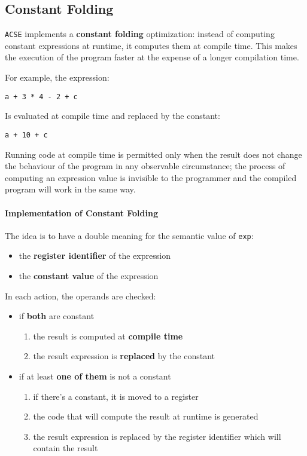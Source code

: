 \subsection{Constant Folding}

\texttt{ACSE} implements a \textbf{constant folding} optimization:
instead of computing constant expressions at runtime, it computes them at compile time.
This makes the execution of the program faster at the expense of a longer compilation time.

For example, the expression:
\begin{center}
  \texttt{a + 3 * 4 - 2 + c}
\end{center}
Is evaluated at compile time and replaced by the constant:
\begin{center}
  \texttt{a + 10 + c}
\end{center}

Running code at compile time is permitted only when the result does not change the behaviour of the program in any observable circumstance;
the process of computing an expression value is invisible to the programmer and the compiled program will work in the same way.

\paragraph{Implementation of Constant Folding}

The idea is to have a double meaning for the semantic value of \texttt{exp}:
\begin{itemize}
  \item the \textbf{register identifier} of the expression
  \item the \textbf{constant value} of the expression
\end{itemize}

In each action, the operands are checked:

\begin{itemize}
  \item if \textbf{both} are constant
        \begin{enumerate}
          \item the result is computed at \textbf{compile time}
          \item the result expression is \textbf{replaced} by the constant
        \end{enumerate}
  \item if at least \textbf{one of them} is not a constant
        \begin{enumerate}
          \item if there's a constant, it is moved to a register
          \item the code that will compute the result at runtime is generated
          \item the result expression is replaced by the register identifier which will contain the result
        \end{enumerate}
\end{itemize}

